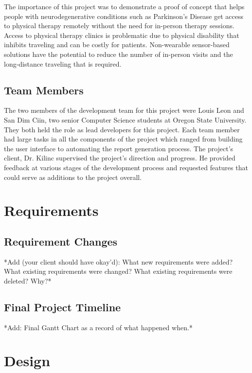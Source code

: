 \documentclass[onecolumn, draftclsnofoot,10pt, compsoc]{IEEEtran}
\begin{document}
The importance of this project was to demonstrate a proof of concept that helps people with neurodegenerative conditions such as Parkinson's Disease get access to physical therapy remotely without the need for in-person therapy sessions. Access to physical therapy clinics is problematic due to physical disability that inhibits traveling and can be costly for patients. Non-wearable sensor-based solutions have the potential to reduce the number of in-person visits and the long-distance traveling that is required. 

\subsection{Team Members}
The two members of the development team for this project were Louis Leon and San Dim Ciin, two senior Computer Science students at Oregon State University. They both held the role as lead developers for this project. Each team member had large tasks in all the components of the project which ranged from building the user interface to automating the report generation process. The project's client, Dr. Kilinc supervised the project's direction and progress. He provided feedback at various stages of the development process and requested features that could serve as additions to the project overall. 
\section{Requirements}
  

\subsection{Requirement Changes}
*Add (your client should have okay'd): What new requirements were added? What existing requirements were changed? What existing requirements were deleted? Why?* 
\subsection{Final Project Timeline}
*Add: Final Gantt Chart as a record of what happened when.* 

\section{Design}
  
\cite{KinectDevelop}
\end{document}
